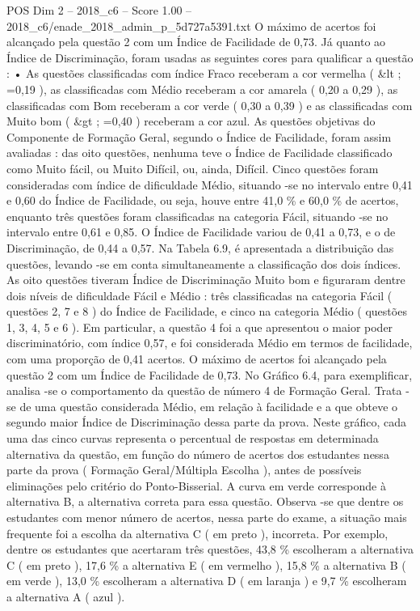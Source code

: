 \begin{textsample}{POS Dim 2 – 2018\_c6 – Score 1.00 – 2018\_c6/enade\_2018\_admin\_p\_5d727a5391.txt}
O máximo de acertos foi alcançado pela questão 2 com um Índice de Facilidade de 0,73.
Já quanto ao Índice de Discriminação, foram usadas as seguintes cores para qualificar a questão : • As questões classificadas com índice Fraco receberam a cor vermelha ( \&lt ; =0,19 ), as classificadas com Médio receberam a cor amarela ( 0,20 a 0,29 ), as classificadas com Bom receberam a cor verde ( 0,30 a 0,39 ) e as classificadas com Muito bom ( \&gt ; =0,40 ) receberam a cor azul.
As questões objetivas do Componente de Formação Geral, segundo o Índice de Facilidade, foram assim avaliadas : das oito questões, nenhuma teve o Índice de Facilidade classificado como Muito fácil, ou Muito Difícil, ou, ainda, Difícil.
Cinco questões foram consideradas com índice de dificuldade Médio, situando -se no intervalo entre 0,41 e 0,60 do Índice de Facilidade, ou seja, houve entre 41,0 \% e 60,0 \% de acertos, enquanto três questões foram classificadas na categoria Fácil, situando -se no intervalo entre 0,61 e 0,85.
O Índice de Facilidade variou de 0,41 a 0,73, e o de Discriminação, de 0,44 a 0,57.
Na Tabela 6.9, é apresentada a distribuição das questões, levando -se em conta simultaneamente a classificação dos dois índices.
As oito questões tiveram Índice de Discriminação Muito bom e figuraram dentre dois níveis de dificuldade Fácil e Médio : três classificadas na categoria Fácil ( questões 2, 7 e 8 ) do Índice de Facilidade, e cinco na categoria Médio ( questões 1, 3, 4, 5 e 6 ).
Em particular, a questão 4 foi a que apresentou o maior poder discriminatório, com índice 0,57, e foi considerada Médio em termos de facilidade, com uma proporção de 0,41 acertos.
O máximo de acertos foi alcançado pela questão 2 com um Índice de Facilidade de 0,73.
No Gráfico 6.4, para exemplificar, analisa -se o comportamento da questão de número 4 de Formação Geral.
Trata -se de uma questão considerada Médio, em relação à facilidade e a que obteve o segundo maior Índice de Discriminação dessa parte da prova.
Neste gráfico, cada uma das cinco curvas representa o percentual de respostas em determinada alternativa da questão, em função do número de acertos dos estudantes nessa parte da prova ( Formação Geral/Múltipla Escolha ), antes de possíveis eliminações pelo critério do Ponto-Bisserial.
A curva em verde corresponde à alternativa B, a alternativa correta para essa questão.
Observa -se que dentre os estudantes com menor número de acertos, nessa parte do exame, a situação mais frequente foi a escolha da alternativa C ( em preto ), incorreta.
Por exemplo, dentre os estudantes que acertaram três questões, 43,8 \% escolheram a alternativa C ( em preto ), 17,6 \% a alternativa E ( em vermelho ), 15,8 \% a alternativa B ( em verde ), 13,0 \% escolheram a alternativa D ( em laranja ) e 9,7 \% escolheram a alternativa A ( azul ).

\end{textsample}
